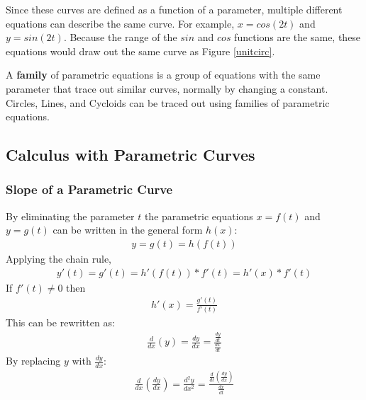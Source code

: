 \documentclass{article}
\begin{document}
Since these curves are defined as a function of a parameter, multiple different equations can describe the same curve. For example, $x=cos(2t)$ and $y=sin(2t)$. Because the range of the $sin$ and $cos$ functions are the same, these equations would draw out the same curve as Figure \ref{unitcirc}.

A \textbf{family} of parametric equations is a group of equations with the same parameter that trace out similar curves, normally by changing a constant. Circles, Lines, and Cycloids can be traced out using families of parametric equations.

\subsection{Calculus with Parametric Curves}
\subsubsection{Slope of a Parametric Curve}
By eliminating the parameter $t$ the parametric equations $x=f(t)$ and $y=g(t)$ can be written in the general form $h(x)$:
\begin{gather*}
    y = g(t) = h(f(t))
\end{gather*}
Applying the chain rule,
\begin{gather*}
y'(t) = g'(t) = h'(f(t))*f'(t) = h'(x)*f'(t)
\end{gather*}
If $f'(t) \neq 0$ then
\begin{gather*}
    h'(x) = \frac{g'(t)}{f'(t)}
\end{gather*}
This can be rewritten as:
\begin{gather*}
    \frac{d}{dx} (y) = \frac{dy}{dx} = \frac{\frac{dy}{dt}}{\frac{dx}{dt}}
\end{gather*}
By replacing $y$ with $\frac{dy}{dx}$:
\begin{gather*}
    \frac{d}{dx} (\frac{dy}{dx}) = \frac{d^2y}{dx^2} = \frac{\frac{d}{dt} (\frac{dy}{dx})}{\frac{dx}{dt}}
\end{gather*}
\end{document}
